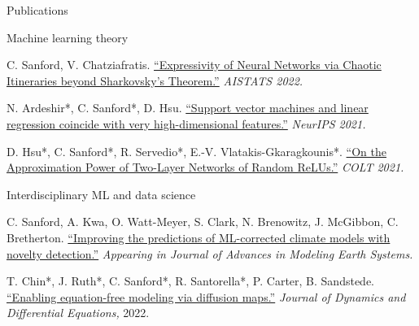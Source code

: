 \documentclass{cv} %
\begin{document}
\begin{rSection}{Publications}
\begin{rSubsection}{Machine learning theory}{}{}{}{}
\item C. Sanford, V. Chatziafratis. \href{https://proceedings.mlr.press/v151/sanford22a.html}{``Expressivity of Neural Networks via Chaotic Itineraries beyond Sharkovsky's Theorem.''} \textit{AISTATS 2022.}

\item N. Ardeshir*, C. Sanford*, D. Hsu. \href{https://proceedings.neurips.cc/paper/2021/hash/26d4b4313a7e5828856bc0791fca39a2-Abstract.html}{``Support vector machines and linear regression coincide with very high-dimensional features.''} \textit{NeurIPS 2021.}

\item D. Hsu*, C. Sanford*, R. Servedio*, E.-V. Vlatakis-Gkaragkounis*. \href{https://proceedings.mlr.press/v134/hsu21a.html}{``On the Approximation Power of Two-Layer Networks of Random ReLUs.''} \textit{COLT 2021.}
\end{rSubsection}

\begin{rSubsection}{Interdisciplinary ML and data science}{}{}{}{}
\item C. Sanford, A. Kwa, O. Watt-Meyer, S. Clark, N. Brenowitz, J. McGibbon, C. Bretherton. \href{https://essopenarchive.org/doi/full/10.22541/essoar.168500343.32924398}{``Improving the predictions of ML-corrected climate models with novelty detection.''} \textit{Appearing in Journal of Advances in Modeling Earth Systems.}

\item T. Chin*, J. Ruth*, C. Sanford*, R. Santorella*, P. Carter, B. Sandstede. \href{https://link.springer.com/article/10.1007/s10884-021-10127-w}{``Enabling equation-free modeling via diffusion maps.''} \textit{Journal of Dynamics and Differential Equations,} 2022.


\end{rSubsection}
\end{rSection}
\end{document}
